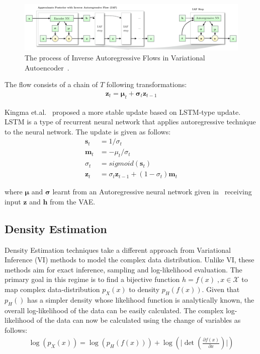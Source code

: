 \documentclass[runningheads]{llncs}
\begin{document}
\begin{figure}[htb]
	\centering
	\includegraphics[width=\textwidth]{imgs/iaf}
	\caption{The process of Inverse Autoregressive Flows in Variational Autoencoder~\cite{kingma2016improved}.}
	\label{fig:iaf}
\end{figure}

The flow consists of a chain of $T$ following transformations:
\begin{align}
\mathbf{z}_t = \bm{\mu}_t + \bm{\sigma}_t\mathbf{z}_{t-1}
\end{align}

Kingma et.al.~\cite{kingma2016improved} proposed a more stable update based on LSTM-type update. LSTM is a type of recurrent neural network that applies autoregressive technique to the neural network.  The update is given as follows:
\begin{align}
\mathbf{s}_t &= 1 / \sigma_t\\
\mathbf{m}_t &= -\mu_t / \sigma_t\\
\sigma_t &= sigmoid(\mathbf{s}_t)\\
\mathbf{z}_t &= \sigma_t\mathbf{z}_{t-1} + (1 - \sigma_t)\mathbf{m}_{t} 
\end{align}

where $\bm{\mu}$ and $\bm{\sigma}$ learnt from an Autoregressive neural network given in~\cite{germain2015made} receiving input $\mathbf{z}$ and $\mathbf{h}$ from the VAE. 

\subsection{Density Estimation}
Density Estimation techniques take a different approach from Variational Inference (VI) methods to model the complex data distribution. Unlike VI, these methods aim for exact inference, sampling and log-likelihood evaluation. The primary goal in this regime is to find a bijective function $h=f(x)\;,x \in \mathcal{X}$ to map complex data-distribution $p_X(x)$ to density $p_H(f(x))$. Given that $p_H()$ has a simpler density whose likelihood function is analytically known, the overall log-likelihood of the data can be easily calculated. The complex log-likelihood of the data can now be calculated using the change of variables as follows:
\begin{align}
\log(p_X(x)) = \log(p_H(f(x))) +
\log(\lvert \det(\frac{\partial f(x)}{\partial x}) \rvert) \label{eq:log-likelihood}
\end{align}
\end{document}
